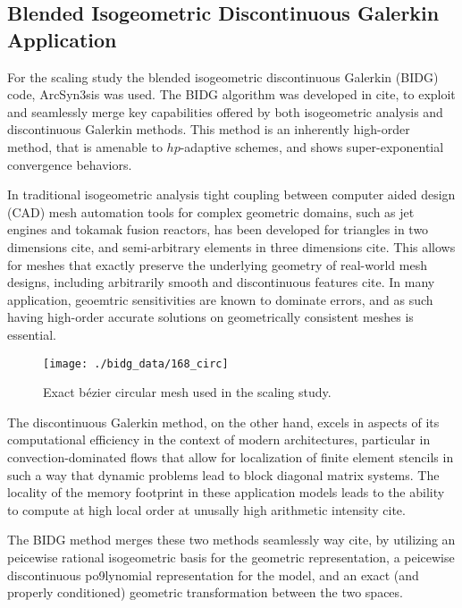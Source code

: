 \subsection{Blended Isogeometric Discontinuous Galerkin Application}
\label{sec:isogeometric}

For the scaling study the blended isogeometric discontinuous Galerkin (BIDG) code, ArcSyn3sis was used.  The BIDG algorithm was developed in cite, to exploit and seamlessly merge key capabilities offered by both isogeometric analysis and discontinuous Galerkin methods. This method is an inherently high-order method, that is amenable to $hp$-adaptive schemes, and shows super-exponential convergence behaviors.

In traditional isogeometric analysis tight coupling between computer aided design (CAD) mesh automation tools for complex geometric domains, such as jet engines and tokamak fusion reactors, has been developed for triangles in two dimensions cite, and semi-arbitrary elements in three dimensions cite.    This allows for meshes that exactly preserve the underlying geometry of real-world mesh designs, including arbitrarily smooth and discontinuous features cite.  In many application, geoemtric sensitivities are known to dominate errors, and as such having high-order accurate solutions on geometrically consistent meshes is essential.


\begin{figure}[h]
\begin{center}
\texttt{[image: ./bidg\_data/168\_circ]}
\end{center}
\vspace*{-.5cm}
\caption{Exact b\'{e}zier circular mesh used in the scaling study.}
\label{fig:dns_scaling}
\end{figure}


The discontinuous Galerkin method, on the other hand, excels in aspects of its computational efficiency in the context of modern architectures, particular in convection-dominated flows that allow for localization of finite element stencils in such a way that dynamic problems lead to block diagonal matrix systems.  The locality of the memory footprint in these application models leads to the ability to compute at high local order at unusally high arithmetic intensity cite.

The BIDG method merges these two methods seamlessly way cite, by utilizing an peicewise rational isogeometric basis for the geometric representation, a peicewise discontinuous po9lynomial representation for the model, and an exact (and properly conditioned) geometric transformation between the two spaces.

